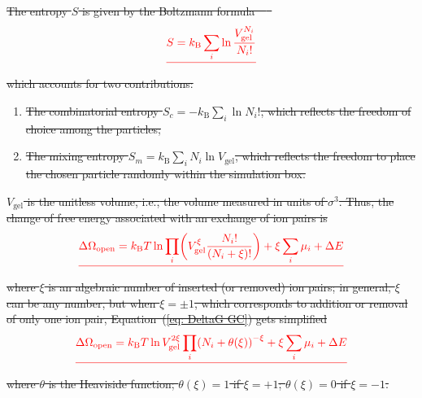 \documentclass[gels,article,accept,pdftex,moreauthors]{Definitions/mdpi}
\newcommand{\ie}{{i.e.,} }
\newcommand{\kT}{k_\mathrm{B}T}
\newcommand{\kB}{k_\mathrm{B}}
\newcommand{\Vgel}{V_\mathrm{gel}}
\newcommand{\refeq}[1]{Equation~(\ref{#1}){}}
\providecommand{\DIFdel}[1]{{\protect\color{red}\sout{#1}}}                      %
\begin{document}
\DIFdel{The entropy $S$ is given by the Boltzmann formula~\mbox{%
\cite{Nagle2004}
}\hspace{0pt}%
}\begin{displaymath}
    \DIFdel{S=\kB\sum_i\ln\frac{\Vgel^{N_i}}{N_i!}%
}\end{displaymath}%
\DIFdel{which accounts for two contributions:
}%
\begin{enumerate}%
\item%
\DIFdel{The combinatorial entropy $S_{c}=-\kB\sum_i\ln N_i!$, which reflects the freedom of choice among the particles;
    }%
\item%
\DIFdel{The mixing entropy $S_{m}=\kB \sum_i N_i\ln \Vgel$, which reflects the freedom to place the chosen particle randomly within the simulation box. 
}
\end{enumerate}%

\DIFdel{$\Vgel$ is the unitless volume, \ie the volume measured in units of $\sigma^3$. 
Thus, the change of free energy associated with an exchange of ion pairs is
}\begin{displaymath}
\DIFdel{\Delta\Omega_\mathrm{open}=\kT\ln\prod_i\left(\Vgel^{\xi}\frac{N_i!}{\left(N_i+\xi\right)!}\right)+\xi\sum_i\mu_i+\Delta E
}\end{displaymath}%
\DIFdel{where $\xi$ is an algebraic number of inserted (or removed) ion pairs; in general, $\xi$ can be any number, but when $\xi = \pm 1$, which corresponds to addition or removal of only one ion pair,  \refeq{eq: DeltaG GC} gets simplified
}\begin{displaymath}
    \DIFdel{\Delta\Omega_\mathrm{open}=\kT\ln \Vgel^{2\xi} \prod_i \left(N_i+\theta(\xi)\right)^{-\xi}+\xi\sum_i\mu_i+\Delta E
\label{eq: DeltaG GC_simpl}
}\end{displaymath}%
\DIFdel{where $\theta$ is the Heaviside function; $\theta(\xi) = 1$ if $\xi=+1$; $\theta(\xi) = 0$ if $\xi=-1$.
}%
\end{document}
